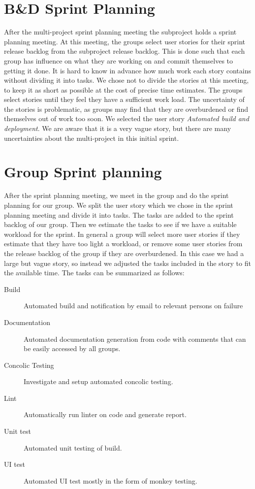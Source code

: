 \section{B\&D Sprint Planning}
After the multi-project sprint planning meeting the \bd subproject holds a sprint planning meeting. At this meeting, the \bd groups select user stories for their sprint release backlog from the \bd subproject release backlog. This is done such that each group has influence on what they are working on and commit themselves to getting it done. It is hard to know in advance how much work each story contains without dividing it into tasks. We chose not to divide the stories at this meeting, to keep it as short as possible at the cost of precise time estimates. The groups select stories until they feel they have a sufficient work load. The uncertainty of the stories is problematic, as groups may find that they are overburdened or find themselves out of work too soon. We selected the user story \emph{Automated build and deployment}. We are aware that it is a very vague story, but there are many uncertainties about the multi-project in this initial sprint.

\section{Group Sprint planning}
After the \bd sprint planning meeting, we meet in the group and do the sprint planning for our group. We split the user story which we chose in the \bd sprint planning meeting and divide it into tasks. The tasks are added to the sprint backlog of our group. Then we estimate the tasks to see if we have a suitable workload for the sprint. In general a group will select more user stories if they estimate that they have too light a workload, or remove some user stories from the release backlog of the group if they are overburdened. In this case we had a large but vague story, so instead we adjusted the tasks included in the story to fit the available time. The tasks can be summarized as follows:

\begin{description}
    \item[Build] Automated build and notification by email to relevant persons on failure
    \item[Documentation] Automated documentation generation from code with comments that can be easily accessed by all groups.
    \item[Concolic Testing] Investigate and setup automated concolic testing.
    \item[Lint] Automatically run linter on code and generate report.
    \item[Unit test] Automated unit testing of build.
    \item[UI test] Automated UI test mostly in the form of monkey testing. 
\end{description}

